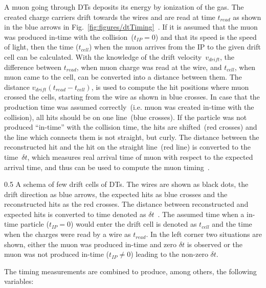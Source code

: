 A muon going through DTs deposits its energy by ionization of the gas. The created charge carriers drift towards the wires and are read at time $t_{read}$ as shown in the blue arrows in Fig.~\ref{fig:figures/dtTiming}~\cite{Traczyk:1365029}. If it is assumed that the muon was produced in-time with the collision~($t_{IP} = 0$) and that its speed is the speed of light, then the time ($t_{cell}$) when the muon arrives from the IP to the given drift cell can be calculated. With the knowledge of the drift velocity~$v_{drift}$, the difference between $t_{read}$, when muon charge was read at the wire, and $t_{cell}$, when muon came to the cell, can be converted into a distance between them. The distance $ v_{drift} (t_{read} - t_{cell})$,  is used to compute the hit positions where muon crossed the cells, starting from the wire as shown in blue crosses. In case that the production time was assumed correctly~(i.e. muon was created in-time with the collision), all hits should be on one line~(blue crosses). If the particle was not produced ``in-time'' with the collision time, the hits are shifted~(red crosses) and the line which connects them is not straight, but curly. The distance between the reconstructed hit and the hit on the straight line~(red line) is converted to the time~$\delta t$, which measures real arrival time of muon with respect to the expected arrival time, and thus can be used to compute the muon timing~\cite{Traczyk:1365029}.


                 {0.5}       %
                 { A schema of few drift cells of DTs. The wires are shown as black dots, the drift direction as blue arrows, the expected hits as blue crosses and the reconstructed hits as the red crosses. The distance between reconstructed and expected hits is converted to time denoted as $\delta t$~\cite{Traczyk:1365029}. The assumed time when a in-time particle ($t_{IP} = 0$) would enter the drift cell is denoted as $t_{cell}$ and the time when the charges were read by a wire as $t_{read}$. In the left corner two situations are shown, either the muon was produced in-time and zero $\delta t$ is observed or the muon was not produced in-time ($t_{IP} \neq 0$) leading to the non-zero $\delta t$. }

The timing measurements are combined to produce, among others, the following variables: 

